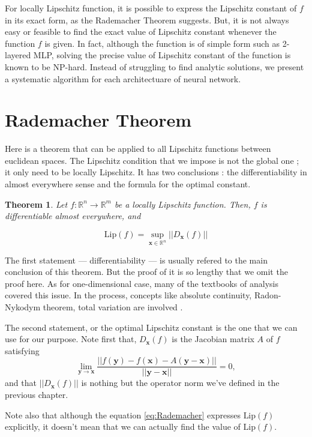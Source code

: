 \documentclass[11pt]{report}
\newtheorem{theorem}{Theorem} %
\newcommand\bx{\ensuremath{\boldsymbol x}}
\newcommand\by{\ensuremath{\boldsymbol y}}
\newcommand\lip{\ensuremath{\text{Lip}}}
\begin{document}
For locally Lipschitz function, it is possible to express the Lipschitz constant of \(f\) in its exact form, as the Rademacher Theorem suggests.
But, it is not always easy or feasible to find the exact value of Lipschitz constant whenever the function \(f\) is given.
In fact, although the function is of simple form such as 2-layered MLP, solving the precise value of Lipschitz constant of the function is known to be NP-hard.
Instead of struggling to find analytic solutions, we present a systematic algorithm for each architectuare of neural network\cite{VA-SK}.

\section{Rademacher Theorem}
Here is a theorem that can be applied to all Lipschitz functions between euclidean spaces.
The Lipschitz condition that we impose is not the global one ; it only need to be locally Lipschitz.
It has two conclusions : the differentiability in almost everywhere sense and the formula for the optimal constant.

\begin{theorem}\label{theo:Rademacher}
\cite{HF}
Let \(f:\mathbb R^n\to\mathbb R^m\) be a locally Lipschitz function.
Then,
\(f\) is differentiable almost everywhere, and
\end{theorem}
\begin{equation}\label{eq:Rademacher}
\lip(f) = \sup_{\bx\in\mathbb R^n}||D_{\bx}(f)||
\end{equation}

The first statement --- differentiability --- is usually refered to the main conclusion of this theorem.
But the proof of it is so lengthy that we omit the proof here.
As for one-dimensional case, many of the textbooks of analysis covered this issue.
In the process, concepts like absolute continuity, Radon-Nykodym theorem, total variation are involved \cite{WR}.

The second statement, or the optimal Lipschitz constant is the one that we can use for our purpose.
Note first that, \(D_{\bx}(f)\) is the Jacobian matrix \(A\) of \(f\) satisfying
\[\lim_{\by\to\bx}\frac{||f(\by)-f(\bx)-A(\by-\bx)||}{||\by-\bx||}=0,\]
and that \(||D_{\bx}(f)||\) is nothing but the operator norm we've defined in the previous chapter.

Note also that although the equation \eqref{eq:Rademacher} expresses \(\lip(f)\) explicitly, it doesn't mean that we can actually find the value of \(\lip(f)\).
\end{document}
